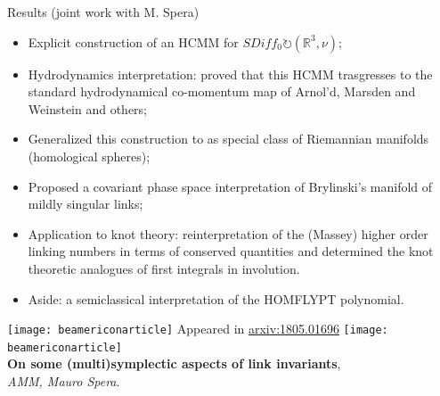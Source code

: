 \documentclass[handout,10pt]{beamer}
\begin{document}
\begin{frame}[fragile]{Results (joint work with M. Spera)}
	\begin{itemize}[<+->]%
		\item Explicit construction of an HCMM for $SDiff_0 \circlearrowright (\mathbb{R}^3,\nu)$;
		\item Hydrodynamics interpretation: proved that this HCMM trasgresses to the standard hydrodynamical co-momentum map of  Arnol'd, Marsden and Weinstein and others;
		\item Generalized this construction to as special class of Riemannian manifolds (homological spheres);
		\item Proposed a covariant phase space interpretation of Brylinski's manifold of mildly singular links;
		\item Application to knot theory: reinterpretation of the (Massey) higher order linking numbers in terms of conserved quantities and determined the knot theoretic analogues of first integrals in involution.
		\item Aside: a semiclassical interpretation of the HOMFLYPT polynomial.%
	\end{itemize}
	\pause
	\begin{center}
		\texttt{[image: beamericonarticle]} Appeared in \href{a}{arxiv:1805.01696} \texttt{[image: beamericonarticle]} \\ 
				\textbf{On some (multi)symplectic aspects of link invariants},\\
				\emph{AMM, Mauro Spera}. 			
	\end{center}	

\end{frame}
\end{document}
